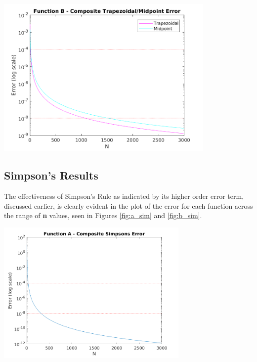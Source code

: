 \documentclass[a4paper]{article}
\begin{document}
\begin{center}
	\includegraphics[width=0.8\textwidth]{../output/b_trapezoidal_midpoint.png}
	\label{fig:b_trap_mid}
\end{center}


\subsection{Simpson's Results}
\label{results:sim}

The effectiveness of Simpson's Rule as indicated by its higher order error term, discussed earlier, is clearly evident in the plot of the error for each function across the range of \textbf{n} values, seen in Figures \ref{fig:a_sim} and \ref{fig:b_sim}.

\begin{center}
	\includegraphics[width=0.7\textwidth]{../output/a_simpsons.png}
	\label{fig:a_sim}
\end{center}
\end{document}
